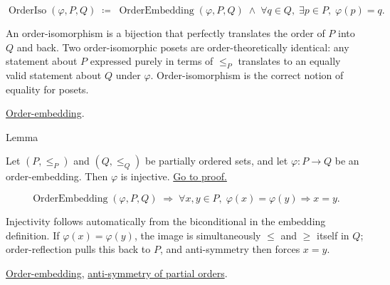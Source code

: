 \begin{remark*}
\[
\operatorname{OrderIso}(\varphi, P, Q)
\;\coloneqq\;
\operatorname{OrderEmbedding}(\varphi, P, Q)
\;\land\;
\forall q \in Q,\; \exists p \in P,\; \varphi(p) = q.
\]
\end{remark*}

\begin{remark*}[Interpretation]
An order-isomorphism is a bijection that perfectly translates the order
of $P$ into $Q$ and back.  Two order-isomorphic posets are
order-theoretically identical: any statement about $P$ expressed purely
in terms of $\leq_P$ translates to an equally valid statement about $Q$
under $\varphi$.  Order-isomorphism is the correct notion of equality
for posets.
\end{remark*}

\begin{dependencies}
\hyperref[def:lattice-order-embedding]{Order-embedding}.
\end{dependencies}


\begin{lemmabox}{Lemma}
\begin{lemma}
\label{lem:order-embedding-injective}
Let $(P, \leq_P)$ and $(Q, \leq_Q)$ be partially ordered sets, and let
$\varphi : P \to Q$ be an order-embedding.  Then $\varphi$ is injective.
\hyperref[prf:order-embedding-injective]{Go to proof.}
\end{lemma}
\end{lemmabox}

\begin{remark*}
\[
\operatorname{OrderEmbedding}(\varphi, P, Q)
\;\Longrightarrow\;
\forall x, y \in P,\; \varphi(x) = \varphi(y) \Rightarrow x = y.
\]
\end{remark*}

\begin{remark*}[Interpretation]
Injectivity follows automatically from the biconditional in the embedding
definition.  If $\varphi(x) = \varphi(y)$, the image is simultaneously
$\leq$ and $\geq$ itself in $Q$; order-reflection pulls this back to $P$,
and anti-symmetry then forces $x = y$.
\end{remark*}

\begin{dependencies}
\hyperref[def:lattice-order-embedding]{Order-embedding},
\hyperref[def:lattice-order-partial-order]{anti-symmetry of partial orders}.
\end{dependencies}
